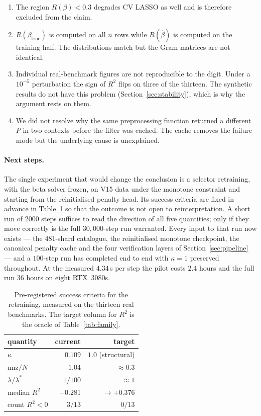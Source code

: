 \documentclass[11pt]{article}
\newcommand{\Rq}{R(\beta)}
\newcommand{\bhat}{\hat{\beta}}
\newcommand{\Rtrue}{R(\beta_{\mathrm{true}})}
\begin{document}
\begin{enumerate}
      been quantified.
\item The region $\Rq < 0.3$ degrades CV LASSO as well and is therefore
      excluded from the claim.
\item $\Rtrue$ is computed on all $n$ rows while $R(\bhat)$ is computed on
      the training half. The distributions match but the Gram matrices are
      not identical.
\item Individual real-benchmark figures are not reproducible to the digit.
      Under a $10^{-5}$ perturbation the sign of $R^2$ flips on three of the
      thirteen. The synthetic results do not have this problem
      (Section~\ref{sec:stability}), which is why the argument rests on them.
\item We did not resolve why the same preprocessing function returned a
      different $P$ in two contexts before the filter was cached. The cache
      removes the failure mode but the underlying cause is unexplained.
\end{enumerate}

\paragraph{Next steps.}
The single experiment that would change the conclusion is a selector
retraining, with the beta solver frozen, on V15 data under the monotone
constraint and starting from the reinitialised penalty head. Its success
criteria are fixed in advance in Table~\ref{tab:criteria} so that the outcome
is not open to reinterpretation. A short run of $2000$ steps suffices to read
the direction of all five quantities; only if they move correctly is the full
$30{,}000$-step run warranted. Every input to that run now exists --- the
$481$-shard catalogue, the reinitialised monotone checkpoint, the canonical
penalty cache and the four verification layers of
Section~\ref{sec:pipeline} --- and a $100$-step run has completed end to end
with $\kappa = 1$ preserved throughout. At the measured $4.34$\,s per step the
pilot costs $2.4$ hours and the full run $36$ hours on eight RTX~3080s.

\begin{table}[h]
\centering
\caption{Pre-registered success criteria for the retraining, measured on the
thirteen real benchmarks. The target column for $R^2$ is the oracle of
Table~\ref{tab:family}.}
\label{tab:criteria}
\begin{tabular}{@{}lrr@{}}
\toprule
quantity & current & target \\
\midrule
$\kappa$                  & $0.109$  & $1.0$ (structural) \\
$\mathrm{nnz}/N$          & $1.04$   & $\approx 0.3$ \\
$\lambda / \lambda^{\ast}$ & $1/100$  & $\approx 1$ \\
median $R^2$              & $+0.281$ & $\to +0.376$ \\
count $R^2 < 0$           & $3/13$   & $0/13$ \\
\bottomrule
\end{tabular}
\end{table}
\end{document}
